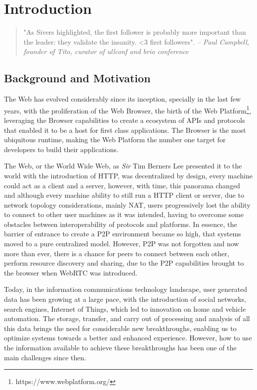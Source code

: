 \chapter{Introduction}\label{ch:intro}

\begin{quotation}
    "As Sivers highlighted, the first follower is probably more important than the leader: they validate the insanity. \textless3 first followers".
    {\small\it -- Paul Campbell, founder of Tito, curator of ullconf and brio conference}
\end{quotation}

\section{Background and Motivation}

The Web has evolved considerably since its inception, specially in the last few years, with the proliferation of the Web Browser, the birth of the Web Platform\footnote{https://www.webplatform.org/}, leveraging the Browser capabilities to create a ecosystem of APIs and protocols that enabled it to be a host for first class applications. The Browser is the most ubiquitous runtime, making the Web Platform the number one target for developers to build their applications.

The Web, or the World Wide Web, as \textit{Sir} Tim Berners Lee presented it to the world with the introduction of HTTP, was decentralized by design, every machine could act as a client and a server, however, with time, this panorama changed and although every machine ability to still run a HTTP client or server, due to network topology considerations, mainly NAT, users progressively lost the ability to connect to other user machines as it was intended, having to overcome some obstacles between interoperability of protocols and platforms. In essence, the barrier of entrance to create a P2P environment became so high, that systems moved to a pure centralized model. However, P2P was not forgotten and now more than ever, there is a chance for peers to connect between each other, perform resource discovery and sharing, due to the P2P capabilities brought to the browser when WebRTC was introduced.

Today, in the information communications technology landscape, user generated data has been growing at a large pace, with the introduction of social networks, search engines, Internet of Things, which led to innovation on home and vehicle automation. The storage, transfer, and carry out of processing and analysis of all this data brings the need for considerable new breakthroughs, enabling us to optimize systems towards a better and enhanced experience. However, how to use the information available to achieve these breakthroughs has been one of the main challenges since then.

